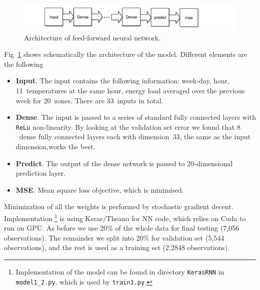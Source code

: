 \documentclass{article} %
\begin{document}
\begin{figure}[h]
\begin{center}
\includegraphics[width=1\linewidth]{energy_NN_diag.pdf}	
\end{center}
\caption{Architecture of feed-forward neural network.}
\label{fig:energy/nn_diag}
\end{figure}
Fig~\ref{fig:energy/nn_diag} shows schematically the architecture of the model.
Different elements are the following
\begin{itemize}
	\item {\bf Input}.
	The input contains the following information: week-day, hour, 11~temperatures
	at the same hour, energy load averaged over the previous week 
	for 20~zones. There are 33~inputs in total.
	\item {\bf Dense}. 
	The input is passed to a series of standard fully connected layers with
	{\tt ReLu} non-linearity. By looking at the validation set error
	we found that $8$~dense fully connected layers each with dimension~33,
	the same as the input dimension,works the best.
	\item {\bf Predict}.
	The output of the dense network is passed to 20-dimensional 
	prediction layer.
	\item {\bf MSE}.
	Mean square loss objective, which is minimised. 
\end{itemize}
Minimization of all the weights is performed by
stochastic gradient decent.
Implementation%
\footnote{
Implementation of the model can be found in directory {\tt KerasRNN}
in {\tt model1\_2.py}, which is used by {\tt train1.py}.
} is using Keras/Theano for NN code, which relies on Cuda to run
on GPU.
As before we use 20\% of the whole data for final testing (7,056 observations). 
The remainder we split into 20\% for validation set (5,544 observations), 
and the rest is used as a training set (2,2848 observations).
\end{document}
